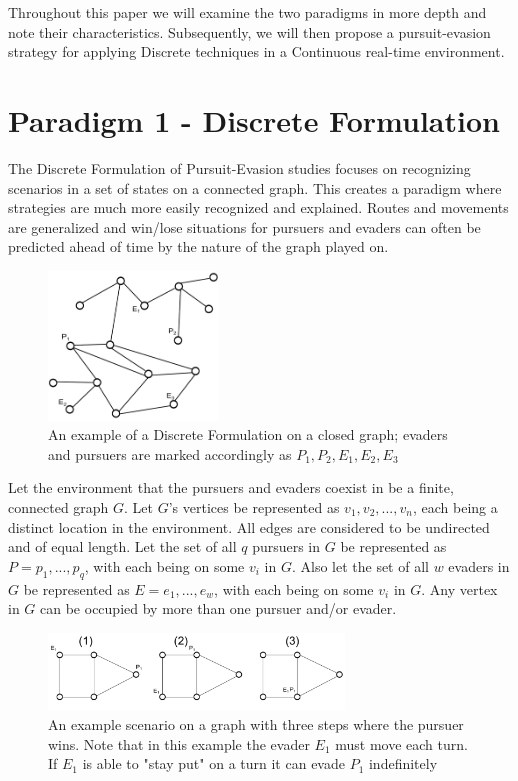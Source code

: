 \documentclass{article}
\begin{document}
Throughout this paper we will examine the two paradigms in more depth and note their characteristics. Subsequently, we will then propose a pursuit-evasion strategy for applying Discrete techniques in a Continuous real-time environment.

\section{Paradigm 1 - Discrete Formulation}
The Discrete Formulation of Pursuit-Evasion studies focuses on recognizing scenarios in a set of states on a connected graph. This creates a paradigm where strategies are much more easily recognized and explained. Routes and movements are generalized and win/lose situations for pursuers and evaders can often be predicted ahead of time by the nature of the graph played on.

\begin{figure}[htb]
\centering
\includegraphics[width=0.4\textwidth]{"graph1"}
\caption{An example of a Discrete Formulation on a closed graph; evaders and pursuers are marked accordingly as \(P_1,P_2,E_1,E_2,E_3\)}
\end{figure}

Let the environment that the pursuers and evaders coexist in be a finite, connected graph \(G\). Let \(G\)'s vertices be represented as \(v_1,v_2,...,v_n\), each being a distinct location in the environment. All edges are considered to be undirected and of equal length. Let the set of all \(q\) pursuers in \(G\) be represented as \(P = {p_1,...,p_q}\), with each being on some \(v_i\) in \(G\). Also let the set of all \(w\) evaders in \(G\) be represented as \(E = {e_1,...,e_w}\), with each being on some \(v_i\) in \(G\). Any vertex in \(G\) can be occupied by more than one pursuer and/or evader.

\begin{figure}[htb]
\centering
\includegraphics[width=0.7\textwidth]{"graph2_steps"}
\caption{An example scenario on a graph with three steps where the pursuer wins. Note that in this example the evader \(E_1\) must move each turn. If \(E_1\) is able to "stay put" on a turn it can evade \(P_1\) indefinitely}
\end{figure}
\end{document}
